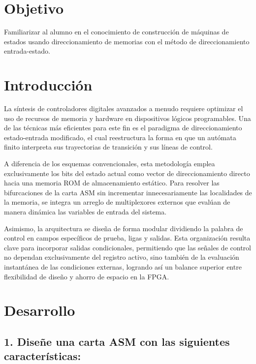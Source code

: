 \documentclass[12pt, letterpaper]{article}
\begin{document}


\section*{Objetivo}

Familiarizar al alumno en el conocimiento de construcción de máquinas de estados usando direccionamiento de memorias con el método de direccionamiento entrada-estado.

\section*{Introducción}

La síntesis de controladores digitales avanzados a menudo requiere optimizar el uso de recursos de memoria y hardware en dispositivos lógicos programables. Una de las técnicas más eficientes para este fin es el paradigma de direccionamiento estado-entrada modificado, el cual reestructura la forma en que un autómata finito interpreta sus trayectorias de transición y sus líneas de control. 

A diferencia de los esquemas convencionales, esta metodología emplea exclusivamente los bits del estado actual como vector de direccionamiento directo hacia una memoria ROM de almacenamiento estático. Para resolver las bifurcaciones de la carta ASM sin incrementar innecesariamente las localidades de la memoria, se integra un arreglo de multiplexores externos que evalúan de manera dinámica las variables de entrada del sistema.

Asimismo, la arquitectura se diseña de forma modular dividiendo la palabra de control en campos específicos de prueba, ligas y salidas. Esta organización resulta clave para incorporar salidas condicionales, permitiendo que las señales de control no dependan exclusivamente del registro activo, sino también de la evaluación instantánea de las condiciones externas, logrando así un balance superior entre flexibilidad de diseño y ahorro de espacio en la FPGA.

\section*{Desarrollo}

\subsection*{1. Diseñe una carta ASM con las siguientes características:}
\end{document}

